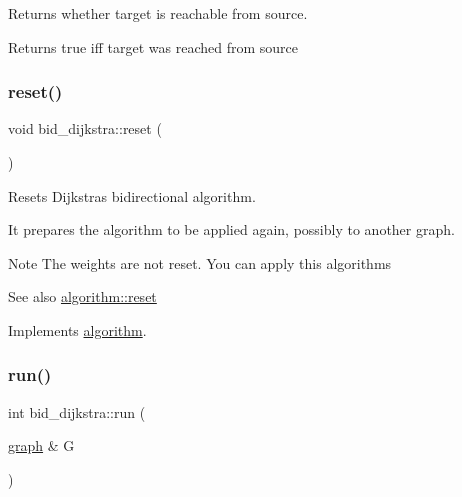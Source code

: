 Returns whether target is reachable from source. 

\begin{DoxyReturn}{Returns}
{\ttfamily true} iff target was reached from source 
\end{DoxyReturn}
\mbox{\label{classbid__dijkstra_a6df2769941bc73fc5626b084745a2258}} 
\subsubsection{\texorpdfstring{reset()}{reset()}}
{\footnotesize\ttfamily void bid\+\_\+dijkstra\+::reset (\begin{DoxyParamCaption}{ }\end{DoxyParamCaption})\hspace{0.3cm}{\ttfamily [virtual]}}



Resets Dijkstra\textquotesingle{}s bidirectional algorithm. 

It prepares the algorithm to be applied again, possibly to another graph.

\begin{DoxyNote}{Note}
The weights are not reset. You can apply this algorithms
\end{DoxyNote}
\begin{DoxySeeAlso}{See also}
\mbox{\hyperlink{classalgorithm_a21aba63d066ae7897de6ca7d8425c408}{algorithm\+::reset}} 
\end{DoxySeeAlso}


Implements \mbox{\hyperlink{classalgorithm_a21aba63d066ae7897de6ca7d8425c408}{algorithm}}.

\mbox{\label{classbid__dijkstra_a1d2f36d3977ef90285442a269a03b919}} 
\subsubsection{\texorpdfstring{run()}{run()}}
{\footnotesize\ttfamily int bid\+\_\+dijkstra\+::run (\begin{DoxyParamCaption}\item[{\mbox{\hyperlink{classgraph}{graph}} \&}]{G }\end{DoxyParamCaption})\hspace{0.3cm}{\ttfamily [virtual]}}



